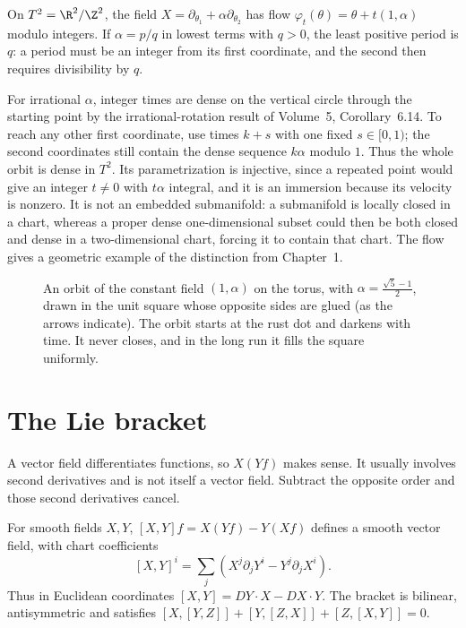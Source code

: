 \begin{example}\label{ex:torusflow}
On $T^2=\R^2/\Z^2$, the field $X=\partial_{\theta_1}+\alpha\partial_{\theta_2}$ has flow $\varphi_t(\theta)=\theta+t(1,\alpha)$ modulo integers. If $\alpha=p/q$ in lowest terms with $q>0$, the least positive period is $q$: a period must be an integer from its first coordinate, and the second then requires divisibility by $q$.

For irrational $\alpha$, integer times are dense on the vertical circle through the starting point by the irrational-rotation result of Volume~5, Corollary~6.14. To reach any other first coordinate, use times $k+s$ with one fixed $s\in[0,1)$; the second coordinates still contain the dense sequence $k\alpha$ modulo $1$. Thus the whole orbit is dense in $T^2$. Its parametrization is injective, since a repeated point would give an integer $t\ne0$ with $t\alpha$ integral, and it is an immersion because its velocity is nonzero. It is not an embedded submanifold: a submanifold is locally closed in a chart, whereas a proper dense one-dimensional subset could then be both closed and dense in a two-dimensional chart, forcing it to contain that chart. The flow gives a geometric example of the distinction from Chapter~1.
\end{example}

\begin{figure}[ht]
\centering
{}
\caption{An orbit of the constant field $(1,\alpha)$ on the torus, with $\alpha=\frac{\sqrt5-1}2$, drawn in the unit square whose opposite sides are glued
(as the arrows indicate). The orbit starts at the rust dot and darkens with time. It never closes, and in the long run it fills the square uniformly.}
\label{fig:torusflow}
\end{figure}

\section{The Lie bracket}

A vector field differentiates functions, so $X(Yf)$ makes sense. It usually involves second derivatives and is not itself a vector field. Subtract the opposite order and those second derivatives cancel.

\begin{proposition}\label{prop:bracket}
For smooth fields $X,Y$, $[X,Y]f=X(Yf)-Y(Xf)$ defines a smooth vector field, with chart coefficients
\[
[X,Y]^i=\sum_j(X^j\partial_jY^i-Y^j\partial_jX^i).
\]
Thus in Euclidean coordinates $[X,Y]=DY\cdot X-DX\cdot Y$. The bracket is bilinear, antisymmetric and satisfies
$[X,[Y,Z]]+[Y,[Z,X]]+[Z,[X,Y]]=0$.
\end{proposition}


